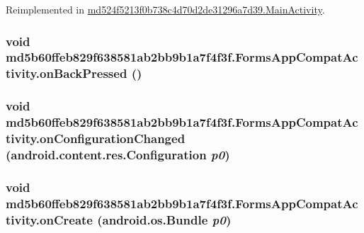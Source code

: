 Reimplemented in \hyperlink{classmd524f5213f0b738c4d70d2de31296a7d39_1_1_main_activity_36576989c07e54a702c70fb7649638cd}{md524f5213f0b738c4d70d2de31296a7d39.MainActivity}.\hypertarget{classmd5b60ffeb829f638581ab2bb9b1a7f4f3f_1_1_forms_app_compat_activity_13db69171e2e438c4fbbb5f59fa9b0fe}{
\subsubsection[{onBackPressed}]{\setlength{\rightskip}{0pt plus 5cm}void md5b60ffeb829f638581ab2bb9b1a7f4f3f.FormsAppCompatActivity.onBackPressed ()}}
\label{classmd5b60ffeb829f638581ab2bb9b1a7f4f3f_1_1_forms_app_compat_activity_13db69171e2e438c4fbbb5f59fa9b0fe}


\hypertarget{classmd5b60ffeb829f638581ab2bb9b1a7f4f3f_1_1_forms_app_compat_activity_6efff316f1a0c8e543de9844c36ea857}{
\subsubsection[{onConfigurationChanged}]{\setlength{\rightskip}{0pt plus 5cm}void md5b60ffeb829f638581ab2bb9b1a7f4f3f.FormsAppCompatActivity.onConfigurationChanged (android.content.res.Configuration {\em p0})}}
\label{classmd5b60ffeb829f638581ab2bb9b1a7f4f3f_1_1_forms_app_compat_activity_6efff316f1a0c8e543de9844c36ea857}


\hypertarget{classmd5b60ffeb829f638581ab2bb9b1a7f4f3f_1_1_forms_app_compat_activity_54bbc6de9184a753b146e365d02fdaa1}{
\subsubsection[{onCreate}]{\setlength{\rightskip}{0pt plus 5cm}void md5b60ffeb829f638581ab2bb9b1a7f4f3f.FormsAppCompatActivity.onCreate (android.os.Bundle {\em p0})}}
\label{classmd5b60ffeb829f638581ab2bb9b1a7f4f3f_1_1_forms_app_compat_activity_54bbc6de9184a753b146e365d02fdaa1}




